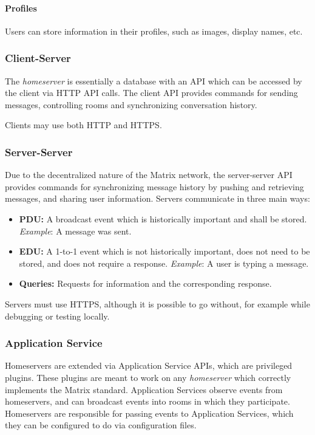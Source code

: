 \paragraph{Profiles}
Users can store information in their profiles, such as images, display names, etc.

\subsubsection{Client-Server}
The \textit{homeserver} is essentially a database with an \ac{API} which can be accessed by the client via \ac{HTTP} \ac{API} calls.
The client \ac{API} provides commands for sending messages, controlling rooms and synchronizing conversation history.

Clients may use both \ac{HTTP} and \ac{HTTPS}.

\subsubsection{Server-Server}
Due to the decentralized nature of the Matrix network, the server-server \ac{API} provides commands for synchronizing message history by pushing and retrieving messages, and sharing user information.
Servers communicate in three main ways:
\begin{itemize}
	\item{
	      \textbf{\ac{PDU}:}
	      A broadcast event which is historically important and shall be stored.
	      \textit{Example}: A message was sent.
	      }
	\item{
	      \textbf{\ac{EDU}:}
	      A 1-to-1 event which is not historically important, does not need to be stored, and does not require a response.
	      \textit{Example}: A user is typing a message.
	      }
	\item{
	      \textbf{Queries:}
	      Requests for information and the corresponding response.
	      }
\end{itemize}
Servers must use \ac{HTTPS}, although it is possible to go without, for example while debugging or testing locally.

\subsubsection{Application Service}
Homeservers are extended via Application Service \ac{API}s, which are privileged plugins.
These plugins are meant to work on any \textit{homeserver} which correctly implements the Matrix standard.
Application Services observe events from homeservers, and can broadcast events into rooms in which they participate.
Homeservers are responsible for passing events to Application Services, which they can be configured to do via configuration files.

